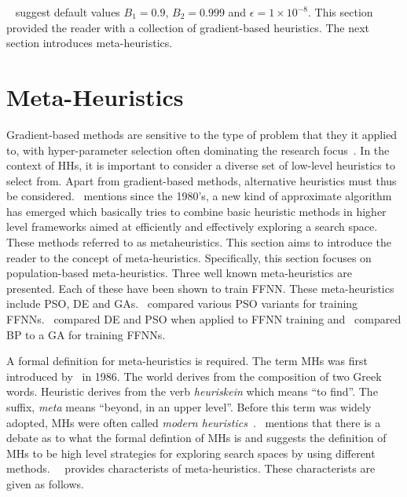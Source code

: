 \citeauthor{ref:kingma:2014}~\cite{ref:kingma:2014} suggest default values $B_{1}=0.9$, $B_{2}=0.999$ and $\epsilon = 1 \times 10^{-8}$. This section provided the reader with a collection of gradient-based heuristics. The next section introduces meta-heuristics.

\section{Meta-Heuristics}
\label{sec:heuristics:mh}

Gradient-based methods are sensitive to the type of problem that they it applied to, with hyper-parameter selection often dominating the research focus~\cite{ref:bengio:2000}\cite{ref:feurer:2019}. In the context of \acp{HH}, it is important to consider a diverse set of low-level heuristics to select from. Apart from gradient-based methods, alternative heuristics must thus be considered.~\cite{ref:blum:2003} mentions since the 1980's, a new kind of approximate algorithm has emerged which basically tries to combine basic heuristic methods in higher level frameworks aimed at efficiently and effectively exploring a search space. These methods referred to as metaheuristics. This section aims to introduce the reader to the concept of meta-heuristics. Specifically, this section focuses on population-based meta-heuristics. Three well known meta-heuristics are presented. Each of these have been shown to train \ac{FFNN}. These meta-heuristics include \ac{PSO}, \ac{DE} and \acp{GA}.~\cite{ref:carvalho:2006} compared various \ac{PSO} variants for training \acp{FFNN}.~\cite{ref:espinal:2011} compared \ac{DE} and \ac{PSO} when applied to \ac{FFNN} training and~\cite{ref:gupta:1999} compared \ac{BP} to a \ac{GA} for training \acp{FFNN}.

A formal definition for meta-heuristics is required. The term \aclp{MH} was first introduced by~\citeauthor{ref:glover:1986}\cite{ref:glover:1986} in 1986. The world derives from the composition of two Greek words. Heuristic derives from the verb \textit{heuriskein} which means ``to find''. The suffix, \textit{meta} means ``beyond, in an upper level''. Before this term was widely adopted, \acp{MH} were often called \textit{modern heuristics}~\cite{ref:reeves:1993}.~\cite{ref:blum:2003} mentions that there is a debate as to what the formal defintion of \acp{MH} is and suggests the definition of \acp{MH} to be high level strategies for exploring search spaces by using different methods.~\citeauthor{ref:blum:2003}~\cite{ref:blum:2003} provides characterists of meta-heuristics. These characterists are given as follows.

